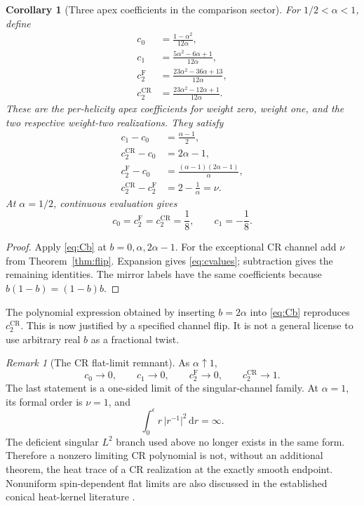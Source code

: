 \documentclass[11pt,a4paper]{article}
\newcommand{\dd}{\mathrm d}
\newcommand{\Fr}{\mathrm F}
\newcommand{\CR}{\mathrm{CR}}
\newcommand{\abs}[1]{\lvert #1\rvert}
\theoremstyle{plain}
\newtheorem{corollary}[theorem]{Corollary}
\theoremstyle{definition}
\theoremstyle{remark}
\newtheorem{remark}[theorem]{Remark}
\numberwithin{equation}{section}
\begin{document}
\begin{corollary}[Three apex coefficients in the comparison sector]
\label{cor:threeC}
For \(1/2<\alpha<1\), define
\begin{align}
c_0&=\frac{1-\alpha^2}{12\alpha},\nonumber\\
c_1&=\frac{5\alpha^2-6\alpha+1}{12\alpha},\nonumber\\
c_2^\Fr&=\frac{23\alpha^2-36\alpha+13}{12\alpha},\nonumber\\
c_2^\CR&=\frac{23\alpha^2-12\alpha+1}{12\alpha}.
\label{eq:cvalues}
\end{align}
These are the per-helicity apex coefficients for weight zero,
weight one, and the two respective weight-two realizations.
They satisfy
\begin{align}
c_1-c_0&=\frac{\alpha-1}{2},\label{eq:c1diff}\\
c_2^\CR-c_0&=2\alpha-1,\label{eq:c2CRdiff}\\
c_2^\Fr-c_0&=
 \frac{(\alpha-1)(2\alpha-1)}{\alpha},\label{eq:c2Fdiff}\\
c_2^\CR-c_2^\Fr&=
 2-\frac1\alpha=\nu.
\label{eq:branchdiff}
\end{align}
At \(\alpha=1/2\), continuous evaluation gives
\[
c_0=c_2^\Fr=c_2^\CR=\frac18,\qquad c_1=-\frac18.
\]
\end{corollary}

\begin{proof}
Apply \eqref{eq:Cb} at \(b=0,\alpha,2\alpha-1\).
For the exceptional CR channel add \(\nu\) from
Theorem~\ref{thm:flip}. Expansion gives \eqref{eq:cvalues};
subtraction gives the remaining identities.
The mirror labels have the same coefficients because
\(b(1-b)=(1-b)b\).
\end{proof}

The polynomial expression obtained by inserting \(b=2\alpha\)
into \eqref{eq:Cb} reproduces \(c_2^\CR\).
This is now justified by a specified channel flip.
It is not a general license to use arbitrary real \(b\) as a
fractional twist.

\begin{remark}[The CR flat-limit remnant]
\label{rem:flatCR}
As \(\alpha\uparrow1\),
\[
c_0\to0,\qquad c_1\to0,\qquad
c_2^\Fr\to0,\qquad c_2^\CR\to1.
\]
The last statement is a one-sided limit of the singular-channel
family. At \(\alpha=1\), its formal order is \(\nu=1\), and
\[
\int_0^\epsilon r\,\abs{r^{-1}}^2\,\dd r=\infty.
\]
The deficient singular \(L^2\) branch used above no longer exists
in the same form. Therefore a nonzero limiting CR polynomial is
not, without an additional theorem, the heat trace of a CR
realization at the exactly smooth endpoint.
Nonuniform spin-dependent flat limits are also discussed in the
established conical heat-kernel literature
\cite{FursaevMiele1997}.
\end{remark}
\end{document}
